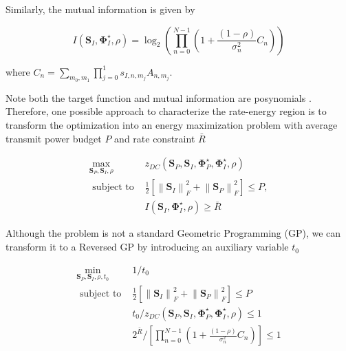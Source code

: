 Similarly, the mutual information is given by

\begin{equation}\label{eqn:mutual_information_posynomial}
  I\left( {{{\mathbf{S}}_I},{\mathbf{\Phi }}_I^ \star ,\rho } \right) = {\log _2}\left( {\prod\limits_{n = 0}^{N - 1} {\left( {1 + \frac{{(1 - \rho )}}{{\sigma _n^2}}{C_n}} \right)} } \right)
\end{equation}

where ${C_n} = \sum\nolimits_{{m_0},{m_1}} {\prod\nolimits_{j = 0}^1 {{s_{I,n,{m_j}}}{A_{n,{m_j}}}} } $.

Note both the target function and mutual information are posynomials \cite{Boyd2007}. Therefore, one possible approach to characterize the rate-energy region is to transform the optimization into an energy maximization problem with average transmit power budget $P$ and rate constraint ${\bar R}$

\begin{eqnarray}
  {\mathop {\max }\limits_{{{\mathbf{S}}_P},{{\mathbf{S}}_I},\rho } }&{{z_{DC}}\left( {{{\mathbf{S}}_P},{{\mathbf{S}}_I},{\mathbf{\Phi }}_P^ \star ,{\mathbf{\Phi }}_I^ \star ,\rho } \right)} \label{eqn:original_target}\\
  {{\text{ subject to }}}&{\frac{1}{2}\left[ {\left\| {{{\mathbf{S}}_I}} \right\|_F^2 + \left\| {{{\mathbf{S}}_P}} \right\|_F^2} \right] \leqslant P,} \label{eqn:original_power_constraint} \\
  {}&{I\left( {{{\mathbf{S}}_I},{\mathbf{\Phi }}_I^ \star ,\rho } \right) \geqslant \bar R} \label{eqn:original_rate_constraint}
\end{eqnarray}

Although the problem is not a standard Geometric Programming (GP), we can transform it to a Reversed GP by introducing an auxiliary variable ${t_0}$ \cite{Chiang2005}

\begin{eqnarray}
  {\mathop {\min }\limits_{{{\mathbf{S}}_P},{{\mathbf{S}}_I},\rho ,{t_0}} }&{1/{t_0}} \label{eqn:transformed_target} \\
  {{\text{ subject to }}}&{\frac{1}{2}\left[ {\left\| {{{\mathbf{S}}_I}} \right\|_F^2 + \left\| {{{\mathbf{S}}_P}} \right\|_F^2} \right] \leqslant P} \label{eqn:transformed_power_constraint} \\
  {}&{{t_0}/{z_{DC}}\left( {{{\mathbf{S}}_P},{{\mathbf{S}}_I},{\mathbf{\Phi }}_P^ \star ,{\mathbf{\Phi }}_I^ \star ,\rho } \right) \leqslant 1} \label{eqn:transformed_current_constraint} \\
  {}&{{2^{\bar R}}/\left[ {\prod\limits_{n = 0}^{N - 1} {\left( {1 + \frac{{(1 - \rho )}}{{\sigma _n^2}}{C_n}} \right)} } \right] \leqslant 1} \label{eqn:transformed_rate_constraint}
\end{eqnarray}

